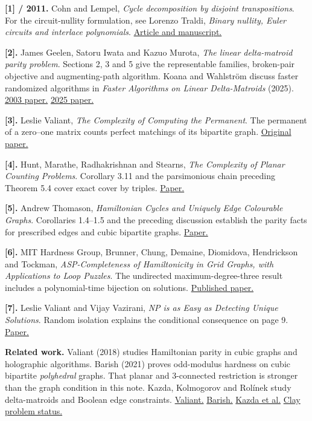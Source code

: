 \documentclass[11pt,letterpaper]{article}
\newcommand{\lab}[1]{\textbf{\color{navy}#1}\enspace}
\newcommand{\citeurl}[2]{\href{#1}{#2}}
\begin{document}
{\small
\lab{[1] / 2011.} Cohn and Lempel, \emph{Cycle decomposition by disjoint transpositions}. For the circuit-nullity formulation, see Lorenzo Traldi, \emph{Binary nullity, Euler circuits and interlace polynomials}. \citeurl{https://arxiv.org/abs/0903.4405}{Article and manuscript.}

\lab{[2].} James Geelen, Satoru Iwata and Kazuo Murota, \emph{The linear delta-matroid parity problem}. Sections 2, 3 and 5 give the representable families, broken-pair objective and augmenting-path algorithm. Koana and Wahlstr\"om discuss faster randomized algorithms in \emph{Faster Algorithms on Linear Delta-Matroids} (2025). \citeurl{https://www.math.uwaterloo.ca/~jfgeelen/Publications/deltamatroidparity.pdf}{2003 paper.} \citeurl{https://doi.org/10.4230/LIPIcs.STACS.2025.62}{2025 paper.}

\lab{[3].} Leslie Valiant, \emph{The Complexity of Computing the Permanent}. The permanent of a zero--one matrix counts perfect matchings of its bipartite graph. \citeurl{https://doi.org/10.1016/0304-3975(79)90044-6}{Original paper.}

\lab{[4].} Hunt, Marathe, Radhakrishnan and Stearns, \emph{The Complexity of Planar Counting Problems}. Corollary 3.11 and the parsimonious chain preceding Theorem 5.4 cover exact cover by triples. \citeurl{https://www.math.ucdavis.edu/~deloera/MISC/LA-BIBLIO/trunk/Lichtenstein/Lichtenstein2.pdf}{Paper.}

\lab{[5].} Andrew Thomason, \emph{Hamiltonian Cycles and Uniquely Edge Colourable Graphs}. Corollaries 1.4--1.5 and the preceding discussion establish the parity facts for prescribed edges and cubic bipartite graphs. \citeurl{https://www.dpmms.cam.ac.uk/~agt2/HC.pdf}{Paper.}

\lab{[6].} MIT Hardness Group, Brunner, Chung, Demaine, Diomidova, Hendrickson and Tockman, \emph{ASP-Completeness of Hamiltonicity in Grid Graphs, with Applications to Loop Puzzles}. The undirected maximum-degree-three result includes a polynomial-time bijection on solutions. \citeurl{https://doi.org/10.4230/LIPIcs.FUN.2024.23}{Published paper.}

\lab{[7].} Leslie Valiant and Vijay Vazirani, \emph{NP is as Easy as Detecting Unique Solutions}. Random isolation explains the conditional consequence on page 9. \citeurl{https://ics.uci.edu/~vazirani/ValVaz.pdf}{Paper.}

\lab{Related work.} Valiant (2018) studies Hamiltonian parity in cubic graphs and holographic algorithms. Barish (2021) proves odd-modulus hardness on cubic bipartite \emph{polyhedral} graphs. That planar and 3-connected restriction is stronger than the graph condition in this note. Kazda, Kolmogorov and Rol\'inek study delta-matroids and Boolean edge constraints. \citeurl{https://people.seas.harvard.edu/~valiant/observations-8-1-17.pdf}{Valiant.} \citeurl{https://doi.org/10.1007/978-3-030-90048-9_6}{Barish.} \citeurl{https://arxiv.org/abs/1602.03124}{Kazda et al.} \citeurl{https://www.claymath.org/millennium/p-vs-np/}{Clay problem status.}
}
\end{document}
